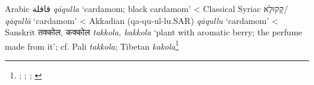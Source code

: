 \begin{etymology}\label{ety:qaqulla}
Arabic {قاقلة} \textit{qāqulla} `cardamom; black cardamom'
< Classical Syriac {{קָקוּלָא}/} \textit{qāqullā} `cardamom'
< Akkadian { (qa-qu-ul-lu.SAR)} \textit{qāqullu} `cardamom'
< Sanskrit {तक्कोल, कक्कोल} \textit{takkola, kakkola} `plant with aromatic berry; the perfume made from it'; cf. Pali \textit{takkola}; Tibetan  \textit{kakola}\footnote{\textcite[863]{wehr_dictionary_1976}; \textcite[Vol. 1, p. 489]{low_flora_1924}; \textcite[58]{zimmern_akkadische_1915}; \textcite[431, 241]{monier-williams_sanskrit-english_1899}}
\end{etymology}
